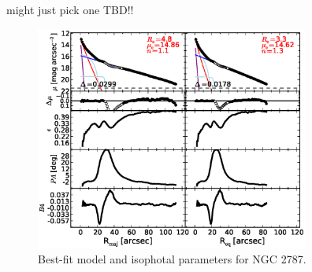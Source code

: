 \documentclass[preprint2]{emulateapj}
\newcommand{\fitfigurewidth}{0.8\textwidth}
\begin{document}
  might just pick one TBD!!

  \begin{figure}[h]
  \begin{center}
  \includegraphics[width=\fitfigurewidth]{images/n2787_1Dfit.eps}
  \caption{Best-fit model and isophotal parameters for NGC 2787.}
  \end{center}
  \end{figure}
\end{document}

